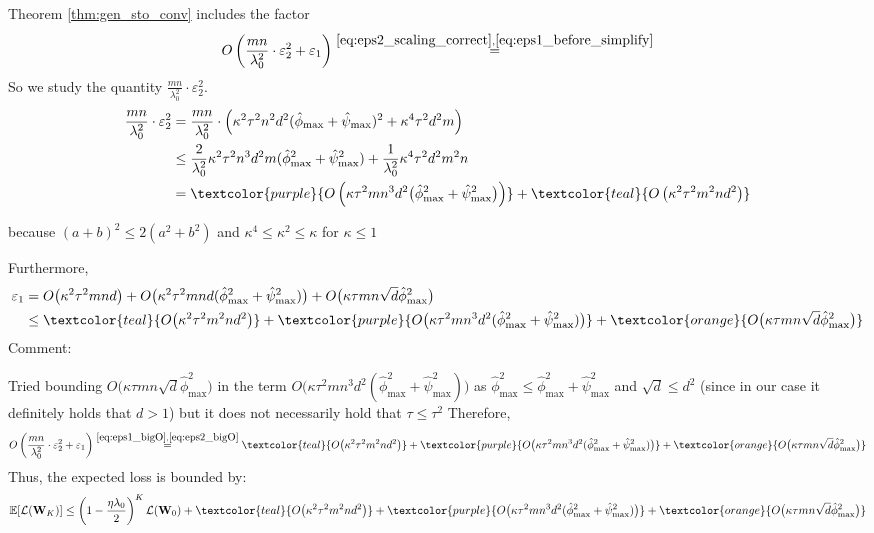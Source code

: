 \documentclass[10pt]{article} %
\theoremstyle{definition}
\theoremstyle{plain}
\newcommand{\paren}[1]{\left(#1\right)}
\begin{document}
Theorem \ref{thm:gen_sto_conv} includes the factor
\begin{align*}
    O\paren{\frac{mn}{\lambda_0^2}\cdot\varepsilon_2^2 + \varepsilon_1} \stackrel{\eqref{eq:eps2_scaling_correct}, \eqref{eq:eps1_before_simplify}}{=} 
\end{align*}
So we study the quantity $\frac{mn}{\lambda_0^2}\cdot\varepsilon_2^2$.
\begin{align}
    \frac{mn}{\lambda_0^2}\cdot\varepsilon_2^2 &=
    \frac{mn}{\lambda_0^2}\cdot \Big(\kappa^2\tau^2 n^2 d^2(\hat\phi_{\max}+\hat\psi_{\max})^2+ \kappa^4\tau^2 d^2 m\Big) \notag\\
    &\leq \frac{2}{\lambda_0^2} \kappa^2\tau^2 n^3 d^2m(\hat\phi_{\max}^2+\hat\psi_{\max}^2)
    + \frac{1}{\lambda_0^2}\kappa^4\tau^2 d^2 m^2n \notag\\
    &= \textcolor{purple}{O\paren{\kappa \tau^2 m n^3 d^2\big(\hat\phi_{\max}^2+\hat\psi_{\max}^2\big)}}
    + \textcolor{teal}{O\paren{\kappa^2\tau^2m^2nd^2}}
    \label{eq:eps2_bigO}
\end{align}

because $(a+b)^2\leq2(a^2+b^2)$ and $\kappa^4\leq\kappa^2\leq\kappa$ for $\kappa\leq1$

Furthermore,
\begin{align}
\varepsilon_1 &= O\big(\kappa^2\tau^2 m n d\big)
    +
    O\big(\kappa^2\tau^2 m n d(\hat\phi_{\max}^2 + \hat\psi_{\max}^2)\big)
    +
    O\big(\kappa\tau m n \sqrt{d}  \hat\phi_{\max}^2\big) \notag\\
    &\leq 
    \textcolor{teal}{O\big(\kappa^2\tau^2 m^2 n d^2\big)} +
    \textcolor{purple}{O\big(\kappa \tau^2 m n^3 d^2(\hat\phi_{\max}^2 + \hat\psi_{\max}^2)\big)} + \textcolor{orange}{O\big(\kappa\tau m n \sqrt{d}  \hat\phi_{\max}^2\big)}
    \label{eq:eps1_bigO}
\end{align}
Comment:

Tried bounding $O\big(\kappa\tau m n \sqrt{d}  \hat\phi_{\max}^2\big)$ in the term $O\big(\kappa\tau^2 m n^3 d^2  (\hat\phi_{\max}^2 + \hat\psi_{\max}^2) \big)$ as  $\hat\phi_{\max}^2 \leq \hat\phi_{\max}^2 + \hat\psi_{\max}^2$ and $\sqrt{d} \leq d^2$ (since in our case it definitely holds that $d>1$) but it does not necessarily hold that $\tau \leq \tau^2$
Therefore, 
\begin{align*}
    O\paren{\frac{mn}{\lambda_0^2}\cdot\varepsilon_2^2 + \varepsilon_1} \stackrel{\eqref{eq:eps1_bigO}, \eqref{eq:eps2_bigO}}{=} \textcolor{teal}{O\big(\kappa^2\tau^2 m^2 n d^2\big)} +
    \textcolor{purple}{O\big(\kappa \tau^2 m n^3 d^2(\hat\phi_{\max}^2 + \hat\psi_{\max}^2)\big)} + \textcolor{orange}{O\big(\kappa\tau m n \sqrt{d}  \hat\phi_{\max}^2\big)}
\end{align*}
Thus, the expected loss is bounded by:
\[
\mathbb{E}[\mathcal{L}(\mathbf{W}_K)] \le \left(1 - \frac{\eta \lambda_0}{2}\right)^K \mathcal{L}(\mathbf{W}_0) + \textcolor{teal}{O\big(\kappa^2\tau^2 m^2 n d^2\big)} +
    \textcolor{purple}{O\big(\kappa \tau^2 m n^3 d^2(\hat\phi_{\max}^2 + \hat\psi_{\max}^2)\big)} + \textcolor{orange}{O\big(\kappa\tau m n \sqrt{d}  \hat\phi_{\max}^2\big)}
\]
\end{document}
